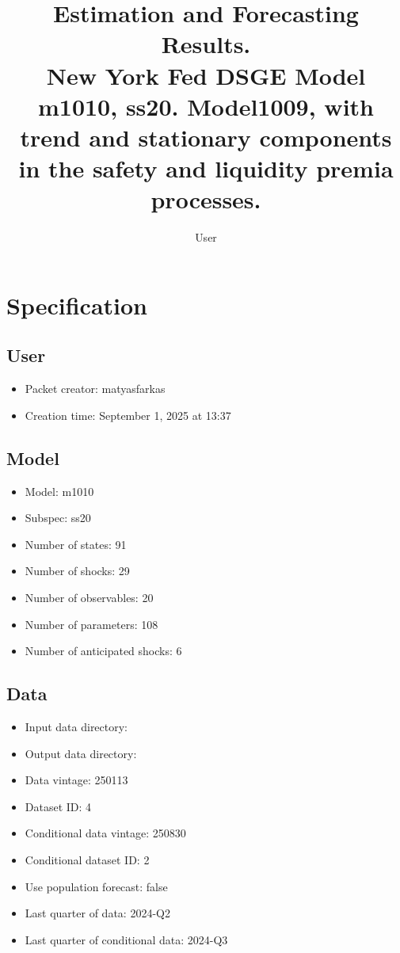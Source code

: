 \documentclass{article}
\title{Estimation and Forecasting Results. \\ New York Fed DSGE Model m1010, ss20. Model1009, with trend and stationary components in the safety and liquidity premia processes.}
\author{User}
\begin{document}
\maketitle


\section{Specification}

\subsection{User}

\begin{itemize}
  \item Packet creator: matyasfarkas
  \item Creation time: September 1, 2025 at 13:37
\end{itemize}

\subsection{Model}

\begin{itemize}
  \item Model: m1010
  \item Subspec: ss20
  \item Number of states: 91
  \item Number of shocks: 29
  \item Number of observables: 20
  \item Number of parameters: 108
  \item Number of anticipated shocks: 6
\end{itemize}

\subsection{Data}

\begin{itemize}
  \item Input data directory: 
  \item Output data directory: 
  \item Data vintage: 250113
  \item Dataset ID: 4
  \item Conditional data vintage: 250830
  \item Conditional dataset ID: 2
  \item Use population forecast: false
  \item Last quarter of data: 2024-Q2
  \item Last quarter of conditional data: 2024-Q3
\end{itemize}
\end{document}
